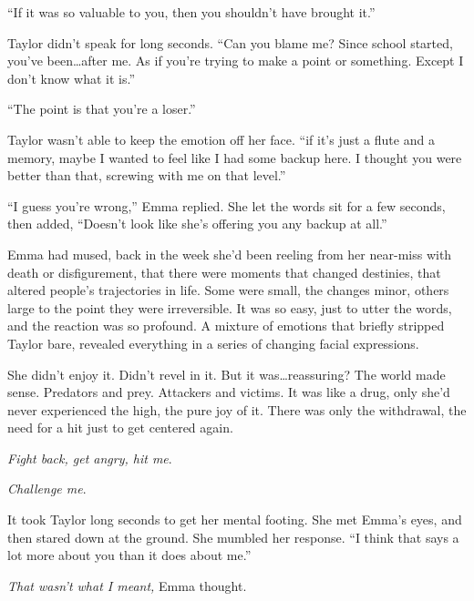 ``If it was so valuable to you, then you shouldn't have brought it.''



Taylor didn't speak for long seconds.  ``Can you blame me?  Since school started, you've been\ldots after me.  As if you're trying to make a point or something.  Except I don't know what it is.''



``The point is that you're a loser.''



Taylor wasn't able to keep the emotion off her face.  ``\ldotsEven if it's just a flute and a memory, maybe I wanted to feel like I had some backup here.  I thought you were better than that, screwing with me on that level.''



``I guess you're wrong,'' Emma replied.  She let the words sit for a few seconds, then added, ``Doesn't look like she's offering you any backup at all.''



Emma had mused, back in the week she'd been reeling from her near-miss with death or disfigurement, that there were moments that changed destinies, that altered people's trajectories in life.  Some were small, the changes minor, others large to the point they were irreversible.  It was so easy, just to utter the words, and the reaction was so profound.  A mixture of emotions that briefly stripped Taylor bare, revealed everything in a series of changing facial expressions.



She didn't enjoy it.  Didn't revel in it.  But it was\ldots reassuring?  The world made sense.  Predators and prey.  Attackers and victims.  It was like a drug, only she'd never experienced the high, the pure joy of it.  There was only the withdrawal, the need for a hit just to get centered again.



\emph{Fight back, get angry, hit me}.



\emph{Challenge me}.



It took Taylor long seconds to get her mental footing.  She met Emma's eyes, and then stared down at the ground.  She mumbled her response.  ``I think that says a lot more about you than it does about me.''



\emph{That wasn't what I meant, }Emma thought.



